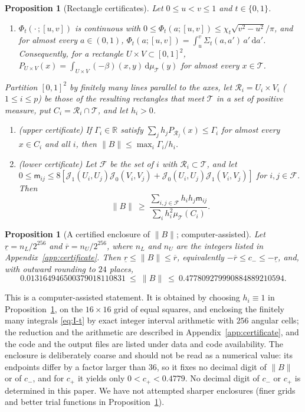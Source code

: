 \documentclass[preprint,12pt,a4paper]{elsarticle}
\newtheorem{proposition}[theorem]{Proposition}
\theoremstyle{remark}
\newcommand{\R}{\mathbb R}
\newcommand{\dd}{\,\mathrm d}
\begin{document}
\begin{proposition}[Rectangle certificates]\label{prop:rectangles}
Let $0\le u<v\le1$ and $t\in\{0,1\}$.
\begin{enumerate}
\item[(a)] $\Phi_t(\cdot\,;[u,v])$ is continuous with
 $0\le \Phi_t(a;[u,v])\le\chi_t\sqrt{v^2-u^2}/\pi$, and for almost every
 $a\in(0,1)$, $\Phi_t(a;[u,v])=\int_u^v\Sigma_t(a,a')\,a'\dd a'$.
 Consequently, for a rectangle $U\times V\subset[0,1]^2$,
 $P_{U\times V}(x)=\int_{U\times V}(-\beta)(x,y)\dd\mu_{\mathcal T}(y)$ for almost every
 $x\in\mathcal T$.
\end{enumerate}
Partition $[0,1]^2$ by finitely many lines parallel to the axes, let
$\mathcal R_i=U_i\times V_i$ ($1\le i\le p$) be those of the resulting
rectangles that meet $\mathcal T$ in a set of positive measure, put
$C_i=\mathcal R_i\cap\mathcal T$, and let $h_i>0$.
\begin{enumerate}
\item[(b)] (upper certificate) If $\Gamma_i\in\R$ satisfy
 $\sum_jh_jP_{\mathcal R_j}(x)\le \Gamma_i$ for almost every $x\in C_i$ and all $i$,
 then $\|B\|\le\max_i\Gamma_i/h_i$.
\item[(c)] (lower certificate) Let $\mathcal F$ be the set of $i$ with
 $\mathcal R_i\subset\mathcal T$, and let
 $0\le\mathsf m_{ij}\le8[\mathcal J_1(U_i,U_j)\mathcal J_0(V_i,V_j)+\mathcal J_0(U_i,U_j)\mathcal J_1(V_i,V_j)]$ for $i,j\in \mathcal F$.
 Then
 \[
  \|B\|\ \ge\ \frac{\sum_{i,j\in \mathcal F}h_ih_j\mathsf m_{ij}}{\sum_ih_i^2\mu_{\mathcal T}(C_i)} .
 \]
\end{enumerate}
\end{proposition}

\begin{proposition}[A certified enclosure of $\|B\|$; computer-assisted]\label{prop:enclosure}
Let $\underline r=n_L/2^{256}$ and $\overline r=n_U/2^{256}$, where $n_L$ and $n_U$
are the integers listed in Appendix~\ref{app:certificate}. Then
$\underline r\le\|B\|\le\overline r$, equivalently
$-\overline r\le c_-\le-\underline r$, and, with outward rounding to $24$ places,
\[
 0.013164946500379018110831\ \le\ \|B\|\ \le\ 0.477809279990884889210594 .
\]
\end{proposition}

This is a computer-assisted statement. It is obtained by choosing $h_i\equiv1$
in Proposition~\ref{prop:rectangles}, on the $16\times16$ grid of equal
squares, and enclosing the finitely many integrals \eqref{eq:I-t} by exact
integer interval arithmetic with $256$ angular cells; the reduction and the
arithmetic are described in Appendix~\ref{app:certificate}, and the code and
the output files are listed under data and code availability.
The enclosure is deliberately coarse and should not be read as a numerical
value: its endpoints differ by a factor larger than $36$, so it fixes no
decimal digit of $\|B\|$ or of $c_-$, and for $c_+$ it yields only
$0<c_+<0.4779$. No decimal digit of $c_-$ or $c_+$ is determined in this
paper. We have not attempted sharper enclosures (finer grids and better trial
functions in Proposition~\ref{prop:rectangles}).
\end{document}
